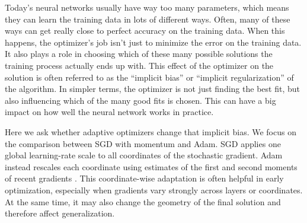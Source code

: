 \documentclass[11pt]{article}
\begin{document}
Today's neural networks usually have way too many parameters, which means they can learn the training data in lots of different ways. Often, many of these ways can get really close to perfect accuracy on the training data. When this happens, the optimizer's job isn't just to minimize the error on the training data. It also plays a role in choosing which of these many possible solutions the training process actually ends up with. This effect of the optimizer on the solution is often referred to as the ``implicit bias'' or ``implicit regularization'' of the algorithm. In simpler terms, the optimizer is not just finding the best fit, but also influencing which of the many good fits is chosen. This can have a big impact on how well the neural network works in practice.

Here we ask whether adaptive optimizers change that implicit bias. We focus on the comparison between SGD with momentum and Adam. SGD applies one global learning-rate scale to all coordinates of the stochastic gradient. Adam instead rescales each coordinate using estimates of the first and second moments of recent gradients \cite{kingma2015adam}. This coordinate-wise adaptation is often helpful in early optimization, especially when gradients vary strongly across layers or coordinates. At the same time, it may also change the geometry of the final solution and therefore affect generalization.
\end{document}
